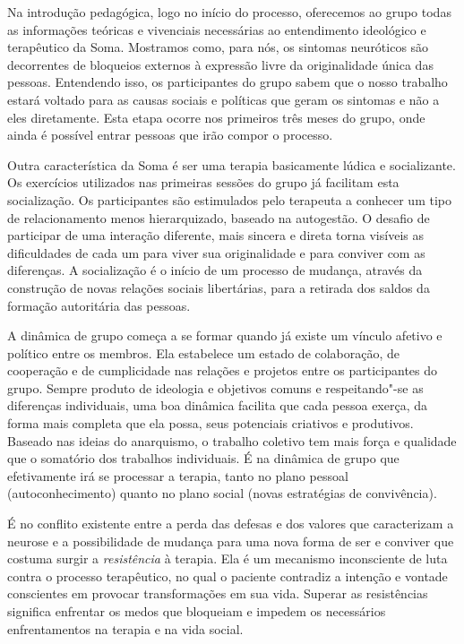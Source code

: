 Na introdução pedagógica, logo no início do processo, oferecemos ao
grupo todas as informações teóricas e vivenciais necessárias ao
entendimento ideológico e terapêutico da Soma. Mostramos como, para nós,
os sintomas neuróticos são decorrentes de bloqueios externos à expressão
livre da originalidade única das pessoas. Entendendo isso, os
participantes do grupo sabem que o nosso trabalho estará voltado para as
causas sociais e políticas que geram os sintomas e não a eles
diretamente. Esta etapa ocorre nos primeiros três meses do grupo, onde
ainda é possível entrar pessoas que irão compor o processo.

Outra característica da Soma é ser uma terapia basicamente lúdica e
socializante. Os exercícios utilizados nas primeiras sessões do grupo já
facilitam esta socialização. Os participantes são estimulados pelo
terapeuta a conhecer um tipo de relacionamento menos hierarquizado,
baseado na autogestão. O desafio de participar de uma interação
diferente, mais sincera e direta torna visíveis as dificuldades de cada
um para viver sua originalidade e para conviver com as diferenças. A
socialização é o início de um processo de mudança, através da construção
de novas relações sociais libertárias, para a retirada dos saldos da
formação autoritária das pessoas.

A dinâmica de grupo começa a se formar quando já existe um vínculo
afetivo e político entre os membros. Ela estabelece um estado de
colaboração, de cooperação e de cumplicidade nas relações e projetos
entre os participantes do grupo. Sempre produto de ideologia e objetivos
comuns e respeitando"-se as diferenças individuais, uma boa dinâmica
facilita que cada pessoa exerça, da forma mais completa que ela possa,
seus potenciais criativos e produtivos. Baseado nas ideias do
anarquismo, o trabalho coletivo tem mais força e qualidade que o
somatório dos trabalhos individuais. É na dinâmica de grupo que
efetivamente irá se processar a terapia, tanto no plano pessoal
(autoconhecimento) quanto no plano social (novas estratégias de
convivência).

É no conflito existente entre a perda das defesas e dos valores que
caracterizam a neurose e a possibilidade de mudança para uma nova forma
de ser e conviver que costuma surgir a \emph{resistência} à terapia. Ela
é um mecanismo inconsciente de luta contra o processo terapêutico, no
qual o paciente contradiz a intenção e vontade conscientes em provocar
transformações em sua vida. Superar as resistências significa enfrentar
os medos que bloqueiam e impedem os necessários enfrentamentos na
terapia e na vida social.

